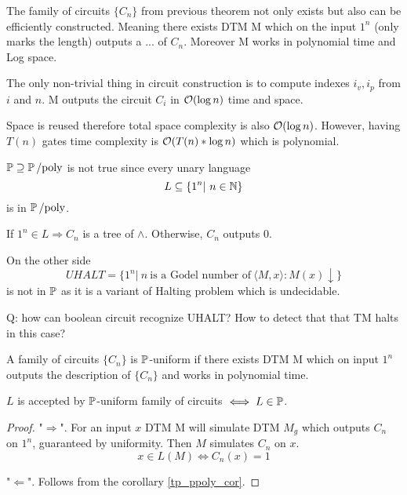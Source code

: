\begin{corollary}\label{tp_ppoly_cor}
	The family of circuits $\{C_n\}$ from previous theorem not only exists but also can be efficiently constructed.
	Meaning there exists DTM M which on the input $1^n$ (only marks the length) outputs a ... of $C_n$.
	Moreover M works in polynomial time and Log space.

	The only non-trivial thing in circuit construction is to compute indexes $i_v, i_p$ from $i$ and $n$.
	M outputs the circuit $C_i$ in $\mathcal{O}(\log n)$ time and space.

	Space is reused therefore total space complexity is also $\mathcal{O}(\log n)$.
	However, having $T(n)$ gates time complexity is $\mathcal{O}(T(n) * \log n)$ which is polynomial.
\end{corollary}

\begin{note}[$\TP \nsupseteq \Ppoly$]
	$\operatorname{\mathbb{P}} \supseteq \operatorname{\operatorname{\mathbb{P}}/poly}$ is not true since every unary language
	\[ L \subseteq \{ 1^n |\ n \in \operatorname{\mathbb{N}} \} \]
	is in $\operatorname{\operatorname{\mathbb{P}}/poly}$.

	If $1^n \in L \Rightarrow C_n$ is a tree of $\land$.
	Otherwise, $C_n$ outputs 0.

	On the other side
	\[ UHALT = \{ 1^n |\ n\ \text{is a Godel number of}\ \langle M, x \rangle: M(x) \downarrow \} \]
	is not in $\operatorname{\mathbb{P}}$ as it is a variant of Halting problem which is undecidable.

	Q: how can boolean circuit recognize UHALT? How to detect that that TM halts in this case?
\end{note}

\begin{definition}
	A family of circuits $\{C_n\}$ is $\operatorname{\mathbb{P}}$-uniform if there exists DTM M which on input $1^n$ outputs the description of $\{C_n\}$ and works in polynomial time.
\end{definition}

\begin{theorem}
	$L$ is accepted by $\operatorname{\mathbb{P}}$-uniform family of circuits $\iff L \in \operatorname{\mathbb{P}}$.
\end{theorem}
\begin{proof}
	"$\Rightarrow$". For an input $x$ DTM M will simulate DTM $M_g$ which outputs $C_n$ on $1^n$, guaranteed by uniformity.
	Then $M$ simulates $C_n$ on $x$.
	\[ x \in L(M) \iff C_n(x) = 1 \]

	"$\Leftarrow$". Follows from the corollary \cref{tp_ppoly_cor}.
\end{proof}

